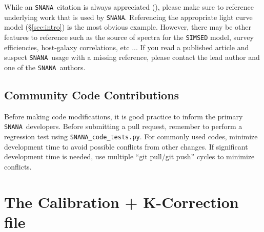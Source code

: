 \documentclass[12pt]{article}
\newcommand{\snana}{{\tt SNANA}}
\begin{document}
{While an \snana\ citation is always appreciated
(\cite{SNANA09}), please make sure to reference 
underlying work that is used by \snana.
Referencing the appropriate light curve model 
(\S\ref{sec:intro}) is the most obvious example.
However, there may be other features to reference such as 
the source of spectra for the {\tt SIMSED} model,
survey efficiencies,
host-galaxy correlations, 
etc ...
If you read a published article and suspect \snana\ usage 
with a missing reference, please contact the lead author
and one of the \snana\ authors.

\subsection{Community Code Contributions}
\label{subsec:code_contributor}

Before making code modifications, it is good practice to 
inform the primary \snana\ developers.
Before submitting a pull request, remember to perform
a regression test using {\tt SNANA\_code\_tests.py}.
For commonly used codes, minimize development time 
to avoid possible conflicts from other changes.
If significant development time is needed, use multiple
``git pull/git push'' cycles to minimize conflicts.


   \clearpage
   \section{The Calibration + K-Correction file}
   \label{sec:kcorFile}

}
\end{document}
